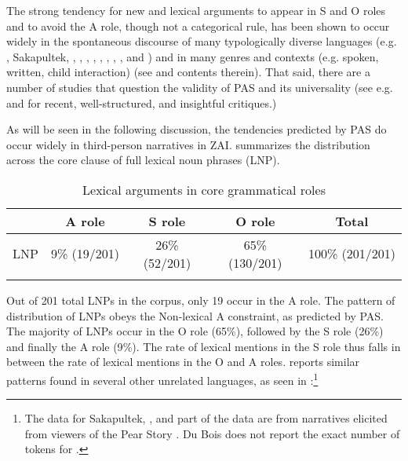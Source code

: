 The strong tendency for new and lexical arguments to appear in S and O roles and to avoid the A role, though not a categorical rule, has been shown to occur widely in the spontaneous discourse of many typologically diverse languages (e.g. , Sakapultek, , , , , , , , ,  and ) and in many genres and contexts (e.g. spoken, written, child interaction) (see \citealt{dubois2003} and contents therein). That said, there are a number of studies that question the validity of PAS and its universality (see e.g. \citealt{haig2016} and \citealt{schnell2017} for recent, well-structured, and insightful critiques.)

\largerpage
As will be seen in the following discussion, the tendencies predicted by PAS do occur widely in third-person narratives in ZAI.  summarizes the distribution across the core clause of full lexical noun phrases (LNP).
\clearpage

\begin{table} 

\caption{{Lexical arguments in core grammatical roles}}
\begin{tabular}{ l  c  c  c  c }
\lsptoprule
 & A role & S role & O role &  {Total} \\

\midrule
 \textsc{LNP} & 9{\%} (19/201) & 26{\%}(52/201) & 65{\%} (130/201) & 100{\%} (201/201) \\
  
\lspbottomrule
\end{tabular}
\label{generaldist} 
\end{table}

Out of 201 total LNPs in the corpus, only 19 occur in the A role. The pattern of distribution of LNPs obeys the Non-lexical A constraint, as predicted by PAS. The majority of LNPs occur in the O role (65{\%}), followed by the S role (26{\%}) and finally the A role (9{\%}).  The rate of lexical mentions in the S role thus falls in between the rate of lexical mentions in the O and A roles. \citet[37]{dubois2003b} reports similar patterns found in several other unrelated languages, as seen in :\footnote{The data for Sakapultek, ,  and part of the  data are from narratives elicited from viewers of the Pear Story \citep[62-63]{dubois2003a}. Du Bois does not report the exact number of tokens for .}


